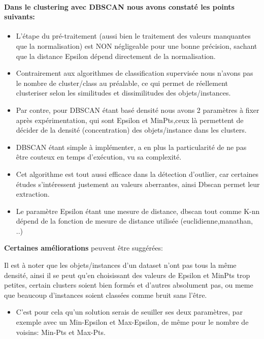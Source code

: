 \documentclass[12pt,a4paper,oneside]{book}
\begin{document}
\paragraph{Dans le clustering avec DBSCAN nous avons constaté les points suivants:}
\begin{itemize}
	\item L'étape du pré-traitement (aussi bien le traitement des valeurs manquantes que la normalisation) est NON négligeable pour une bonne précision, sachant que la distance Epsilon  dépend directement de la normalisation.
	
	\item Contrairement aux algorithmes de classification supervisée nous n'avons pas le nombre de cluster/class au préalable, ce qui permet de réellement clusteriser selon les similitudes et dissimilitudes des objets/instances.
	
	\item Par contre, pour DBSCAN étant basé densité nous avons 2 paramètres à fixer après expérimentation, qui sont Epsilon et MinPts,ceux là permettent de décider de la densité (concentration) des objets/instance dans les clusters.
	
	\item  DBSCAN étant simple à implémenter, a en plus la particularité de ne pas être couteux en temps d'exécution, vu sa complexité.
	
	\item Cet algorithme est tout aussi efficace dans la détection d'outlier, car certaines études s'intéressent justement au valeurs aberrantes, ainsi Dbscan permet leur extraction.
	
	\item Le paramètre Epsilon étant une mesure de distance, dbscan tout comme K-nn dépend de la fonction de mesure de distance utilisée (euclidienne,manathan, ..)
\end{itemize} 

\textbf{Certaines améliorations} peuvent être suggérées:

Il est à noter que les objets/instances d'un dataset n'ont pas tous la même densité, ainsi il se peut qu'en choisissant des valeurs de Epsilon et MinPts trop petites, certain clusters soient bien formés et d'autres absolument pas, ou meme que beaucoup d'instances soient classées comme bruit sans l'être.
\begin{itemize}
	\item C'est pour cela qu'un solution serais de seuiller ses deux paramètres, par exemple avec un Min-Epsilon et Max-Epsilon, de même pour le nombre de voisins: Min-Pts et Max-Pts.
\end{itemize}
\end{document}
